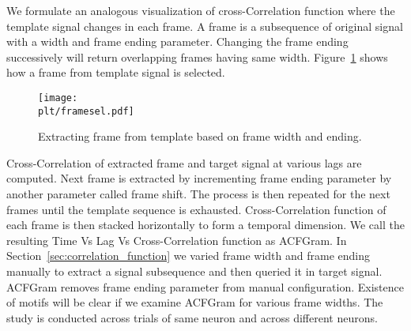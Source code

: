 \documentclass[MTech]{iitmdiss}
\newcommand{\plt}{thesis_plots}
\begin{document}
We formulate an analogous visualization of cross-Correlation function where the template signal changes in each frame. A frame is a subsequence of original signal with a width and frame ending parameter. Changing the frame ending successively will return overlapping frames having same width. Figure~\ref{img:framesel} shows how a frame from template signal is selected.
\begin{figure}[h]
    \centering
    \texttt{[image: \\plt/framesel.pdf]}
    \caption{Extracting frame from template based on frame width and ending.}
    \label{img:framesel}
\end{figure}
Cross-Correlation of extracted frame and target signal at various lags are computed. Next frame is extracted by incrementing frame ending parameter by another parameter called frame shift. The process is then repeated for the next frames until the template sequence is exhausted. Cross-Correlation function of each frame is then stacked horizontally to form a temporal dimension. We call the resulting Time Vs Lag Vs Cross-Correlation function as ACFGram.
In Section~\ref{sec:correlation_function} we varied frame width and frame ending manually to extract a signal subsequence and then queried it in target signal. ACFGram removes frame ending parameter from manual configuration. Existence of motifs will be clear if we examine ACFGram for various frame widths. The study is conducted across trials of same neuron and across different neurons.
\end{document}
